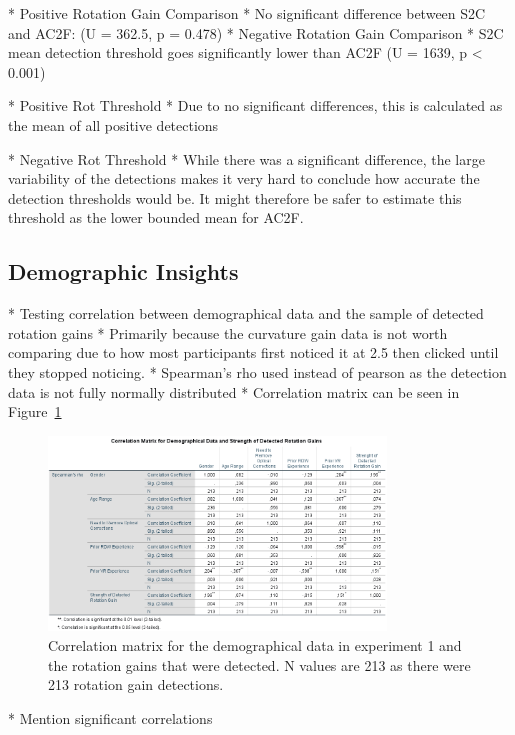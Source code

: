 * Positive Rotation Gain Comparison
   * No significant difference between S2C and AC2F: (U = 362.5, p = 0.478)
* Negative Rotation Gain Comparison
   * S2C mean detection threshold goes significantly lower than AC2F (U = 1639, p < 0.001)
   
* Positive Rot Threshold
   * Due to no significant differences, this is calculated as the mean of all positive detections
   
* Negative Rot Threshold
   * While there was a significant difference, the large variability of the detections makes it very hard to conclude how accurate the detection thresholds would be. It might therefore be safer to estimate this threshold as the lower bounded mean for AC2F.

\subsection{Demographic Insights}
* Testing correlation between demographical data and the sample of detected rotation gains
   * Primarily because the curvature gain data is not worth comparing due to how most participants first noticed it at 2.5 then clicked until they stopped noticing. 
* Spearman's rho used instead of pearson as the detection data is not fully normally distributed
* Correlation matrix can be seen in Figure~\ref{fig:ex1demogcorrelationmatrix}

\begin{figure}[tbph]
    \centering
    \includegraphics[width=0.8\textwidth]{figures/graphs/DemographicalCorrelations.png}
    \caption[Experiment 1 Demographical Correlation Matrix]{Correlation matrix for the demographical data in experiment 1 and the rotation gains that were detected. N values are 213 as there were 213 rotation gain detections.}
    \label{fig:ex1demogcorrelationmatrix}
\end{figure}

* Mention significant correlations

